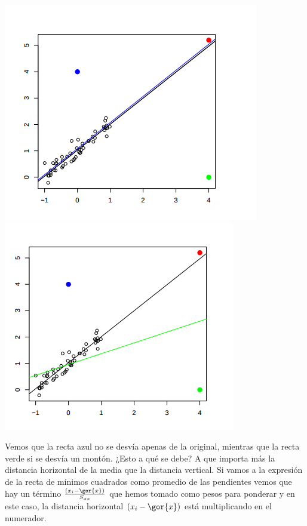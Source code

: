 \begin{example}
\begin{center}
\includegraphics[scale=0.4]{img/sobredistanciahorizontal1.png}
\includegraphics[scale=0.4]{img/sobredistanciahorizontal2.png}
\end{center}

Vemos que la recta azul no se desvía apenas de la original, mientras que la recta verde si se desvía un montón. ¿Esto a qué se debe? A que importa más la distancia horizontal de la media que la distancia vertical. Si vamos a la expresión de la recta de mínimos cuadrados como promedio de las pendientes \label{rmc::promediopendientes} vemos que hay un término $\frac{(x_i - \gor{x})}{S_{xx}}$ que hemos tomado como pesos para ponderar y en este caso, la distancia horizontal $(x_i - \gor{x})$ está multiplicando en el numerador.



\end{example}





